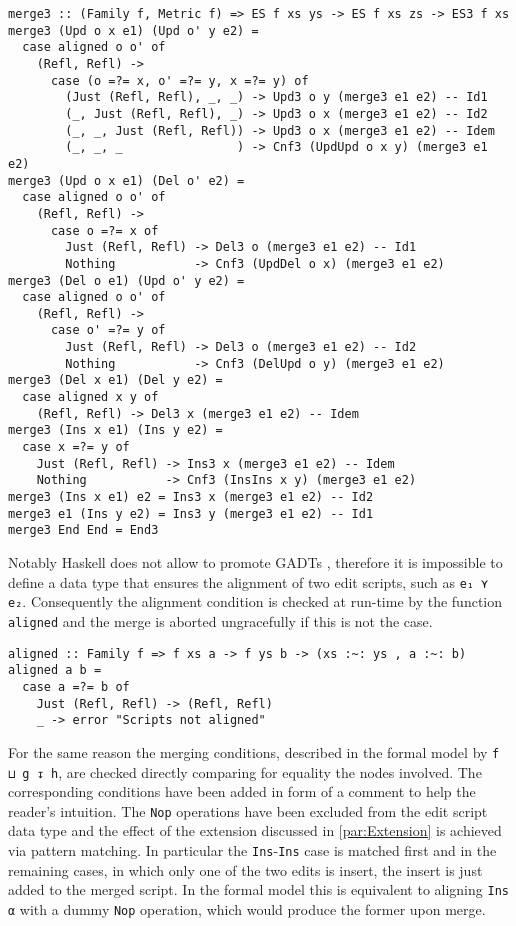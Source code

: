 \documentclass[../Thesis.tex]{subfiles}
\begin{document}
\begin{verbatim}
merge3 :: (Family f, Metric f) => ES f xs ys -> ES f xs zs -> ES3 f xs
merge3 (Upd o x e1) (Upd o' y e2) =
  case aligned o o' of
    (Refl, Refl) ->
      case (o =?= x, o' =?= y, x =?= y) of
        (Just (Refl, Refl), _, _) -> Upd3 o y (merge3 e1 e2) -- Id1
        (_, Just (Refl, Refl), _) -> Upd3 o x (merge3 e1 e2) -- Id2
        (_, _, Just (Refl, Refl)) -> Upd3 o x (merge3 e1 e2) -- Idem
        (_, _, _                ) -> Cnf3 (UpdUpd o x y) (merge3 e1 e2)
merge3 (Upd o x e1) (Del o' e2) =
  case aligned o o' of
    (Refl, Refl) -> 
      case o =?= x of
        Just (Refl, Refl) -> Del3 o (merge3 e1 e2) -- Id1
        Nothing           -> Cnf3 (UpdDel o x) (merge3 e1 e2)
merge3 (Del o e1) (Upd o' y e2) = 
  case aligned o o' of
    (Refl, Refl) -> 
      case o' =?= y of
        Just (Refl, Refl) -> Del3 o (merge3 e1 e2) -- Id2
        Nothing           -> Cnf3 (DelUpd o y) (merge3 e1 e2)
merge3 (Del x e1) (Del y e2) =
  case aligned x y of
    (Refl, Refl) -> Del3 x (merge3 e1 e2) -- Idem
merge3 (Ins x e1) (Ins y e2) =
  case x =?= y of
    Just (Refl, Refl) -> Ins3 x (merge3 e1 e2) -- Idem
    Nothing           -> Cnf3 (InsIns x y) (merge3 e1 e2)
merge3 (Ins x e1) e2 = Ins3 x (merge3 e1 e2) -- Id2
merge3 e1 (Ins y e2) = Ins3 y (merge3 e1 e2) -- Id1
merge3 End End = End3
\end{verbatim}

	Notably Haskell does not allow to promote GADTs \cite{Yorgey12}, 
	therefore it is impossible to define a data type that ensures the
	alignment of two edit scripts, such as \texttt{e₁ ⋎ e₂}.
	Consequently the alignment condition is checked at
	run-time by the function \texttt{aligned} 
	and the merge is aborted ungracefully if this is not the case.

\begin{verbatim}
aligned :: Family f => f xs a -> f ys b -> (xs :~: ys , a :~: b)
aligned a b =
  case a =?= b of
    Just (Refl, Refl) -> (Refl, Refl)
    _ -> error "Scripts not aligned"
\end{verbatim} 

	For the same reason the merging conditions, described in the formal 
	model by \texttt{f ⊔ g ↧ h}, are checked directly
	comparing for equality the nodes involved. The corresponding conditions
	have been added in form of a comment to help the reader's intuition.
	The \texttt{Nop} operations have been excluded from the edit
	script data type and the effect of the extension discussed in 
	\ref{par:Extension} is achieved via pattern matching.
	In particular the \texttt{Ins}-\texttt{Ins} case is matched first and
	in the remaining cases, in which only one of the two edits is insert,
	the insert is just added to the merged script. 
	In the formal model this is equivalent to aligning \texttt{Ins α} with
	a dummy \texttt{Nop} operation, which would produce the former upon 
	merge.
	
\end{document}
